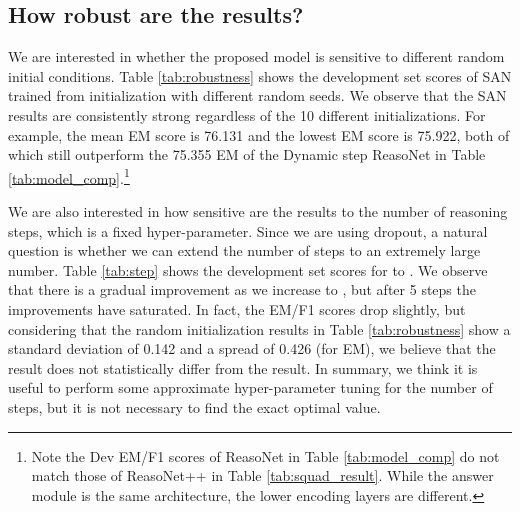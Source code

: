 \documentclass[11pt,a4paper]{article}
\begin{document}
\subsection{How robust are the results?}

We are interested in whether the proposed model is sensitive to different random initial conditions. 
Table \ref{tab:robustness} shows the development set scores of SAN trained from initialization with different random seeds.
We observe that the SAN results are consistently strong regardless of the 10 different initializations. 
For example, the mean EM score is 76.131 and the lowest EM score is 75.922, both of which still outperform the 75.355 EM of the Dynamic step ReasoNet in Table \ref{tab:model_comp}.\footnote{Note the Dev EM/F1 scores of ReasoNet in Table \ref{tab:model_comp} do not match those of ReasoNet++ in Table \ref{tab:squad_result}. While the answer module is the same architecture, the lower encoding layers are different.}

We are also interested in how sensitive are the results to the number of reasoning steps, which is a fixed hyper-parameter. 
Since we are using dropout, a natural question is whether we can extend the number of steps to an extremely large number. 
Table \ref{tab:step} shows the development set scores for  to .
We observe that there is a gradual improvement as we increase  to , but after 5 steps the improvements have saturated. 
In fact, the EM/F1 scores drop slightly, but considering that the random initialization results in Table \ref{tab:robustness} show a standard deviation of 0.142 and a spread of 0.426 (for EM), we believe that the  result does not statistically differ from the  result. 
In summary, we think it is useful to perform some approximate hyper-parameter tuning for the number of steps, but it is not necessary to find the exact optimal value. 
 
\end{document}
